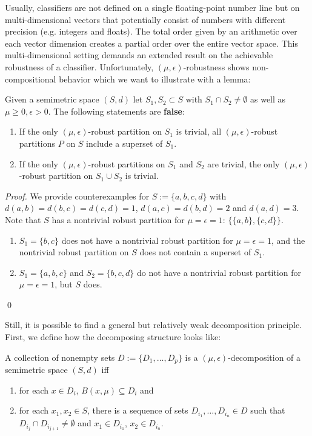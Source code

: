 Usually, classifiers are not defined on a single floating-point number line but on multi-dimensional vectors that potentially consist of numbers with different precision (e.g. integers and floats). The total order given by an arithmetic over each vector dimension creates a partial order over the entire vector space. This multi-dimensional setting demands an extended result on the achievable robustness of a classifier. Unfortunately, $(\mu,\epsilon)$-robustness shows non-compositional behavior which we want to illustrate with a lemma:
\begin{lemma}
\label{lem:noncompositional}
Given a semimetric space $(S, d)$ let $S_1, S_2 \subset S$ with $S_1 \cap S_2 \neq \emptyset$ as well as $\mu \geq 0, \epsilon > 0$. The following statements are \textbf{false}:
\begin{enumerate}
    \item If the only $(\mu, \epsilon)$-robust partition on $S_1$ is trivial, all $(\mu, \epsilon)$-robust partitions $P$ on $S$ include a superset of $S_1$.
    \item If the only $(\mu, \epsilon)$-robust partitions on $S_1$ and $S_2$ are trivial, the only $(\mu, \epsilon)$-robust partition on $S_1 \cup S_2$ is trivial.
\end{enumerate}
\end{lemma}
\begin{proof}
We provide counterexamples for $S := \{a,b,c,d\}$ with $d(a,b) = d(b,c) = d(c,d) = 1$, $d(a,c) = d(b,d) = 2$ and $d(a,d) = 3$. Note that $S$ has a nontrivial robust partition for $\mu = \epsilon = 1$: $\{\{a,b\},\{c,d\}\}$.
\begin{enumerate}
    \item $S_1 = \{b,c\}$ does not have a nontrivial robust partition for $\mu = \epsilon = 1$, and the nontrivial robust partition on $S$ does not contain a superset of $S_1$.
    \item $S_1 = \{a,b,c\}$ and $S_2 = \{b,c,d\}$ do not have a nontrivial robust partition for $\mu = \epsilon = 1$, but $S$ does.
\end{enumerate}
\qed
\end{proof}

Still, it is possible to find a general but relatively weak decomposition principle. First, we define how the decomposing structure looks like:
\begin{definition}
    \label{def:decomposition}
    A collection of nonempty sets $D := \{D_1,\dots,D_p\}$ is a $(\mu, \epsilon)$-decomposition of a semimetric space $(S, d)$ iff
    \begin{enumerate}
        \item for each $x \in D_i$, $B(x, \mu) \subseteq D_i$ and
        \item for each $x_1, x_2 \in S$, there is a sequence of sets $D_{i_1},\dots,D_{i_n} \in D$ such that $D_{i_{j}} \cap D_{i_{j+1}} \neq \emptyset$ and $x_1 \in D_{i_1}$, $x_2 \in D_{i_n}$. 
    \end{enumerate} 
\end{definition}

